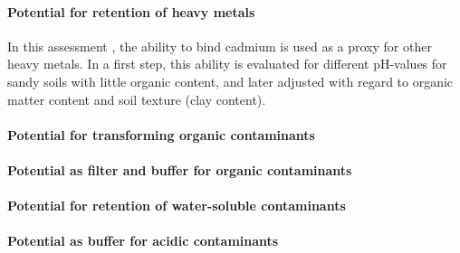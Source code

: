 \documentclass[preprint,12pt,authoryear]{elsarticle}
\begin{document}
\paragraph{Potential for retention of heavy metals}
In this assessment , the ability to bind cadmium is used as a proxy for other heavy metals. In a first step, this ability is evaluated for different pH-values for sandy soils with little organic content, and later adjusted with regard to organic matter content and soil texture (clay content).
\paragraph{Potential for transforming organic contaminants}

\paragraph{Potential as filter and buffer for organic contaminants}

\paragraph{Potential for retention of water-soluble contaminants}

\paragraph{Potential as buffer for acidic contaminants}
\end{document}
